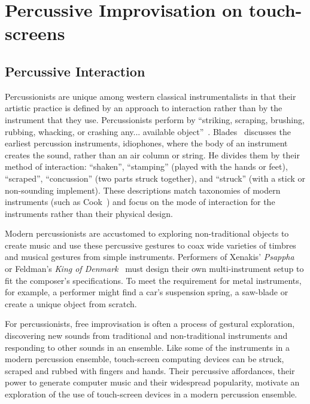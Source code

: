 \documentclass[graybox]{svmult}
\begin{document}
\section{Percussive Improvisation on touch-screens}

\subsection{Percussive Interaction}

Percussionists are unique among western classical instrumentalists in
that their artistic practice is defined by an approach to interaction
rather than by the instrument that they use. Percussionists perform by
``striking, scraping, brushing, rubbing, whacking, or crashing any...
available object''~\cite{Schick:2006fk}. Blades~\cite{Blades:1992kx}
discusses the earliest percussion instruments, idiophones, where the
body of an instrument creates the sound, rather than an air column or
string. He divides them by their method of interaction: ``shaken'',
``stamping'' (played with the hands or feet), ``scraped'',
``concussion'' (two parts struck together), and ``struck'' (with a
stick or non-sounding implement). These descriptions match taxonomies
of modern instruments (such as Cook~\cite{Cook:1997vn}) and focus on
the mode of interaction for the instruments rather than their physical
design.

Modern percussionists are accustomed to exploring non-traditional
objects to create music and use these percussive gestures to coax wide
varieties of timbres and musical gestures from simple instruments.
Performers of Xenakis' \emph{Psappha}~\cite{Xenakis:1975uq} or
Feldman's \emph{King of Denmark}~\cite{Feldman:1965uq} must design
their own multi-instrument setup to fit the composer's specifications.
To meet the requirement for metal instruments, for example, a
performer might find a car's suspension spring, a saw-blade or create
a unique object from scratch.

For percussionists, free improvisation is often a process of gestural
exploration, discovering new sounds from traditional and
non-traditional instruments and responding to other sounds in an
ensemble. Like some of the instruments in a modern percussion
ensemble, touch-screen computing devices can be struck, scraped and
rubbed with fingers and hands. Their percussive affordances, their
power to generate computer music and their widespread popularity,
motivate an exploration of the use of touch-screen devices in a modern
percussion ensemble.
\end{document}

